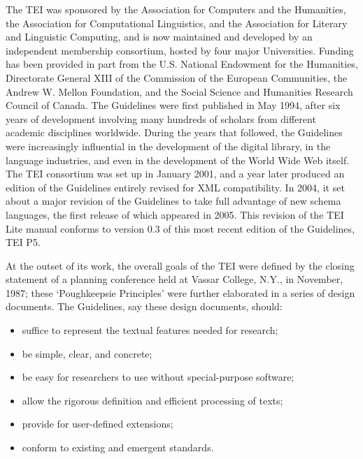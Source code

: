 \documentclass[11pt,twoside]{article}\makeatletter
\begin{document}
The TEI was sponsored by the Association for Computers and         the Humanities, the Association for Computational Linguistics,         and the Association for Literary and Linguistic Computing, and         is now maintained and developed by an independent membership         consortium, hosted by four major Universities. Funding has         been provided in part from the U.S. National Endowment for the         Humanities, Directorate General XIII of the Commission of the         European Communities, the Andrew W. Mellon Foundation, and the         Social Science and Humanities Research Council of Canada. The         Guidelines were first published in May 1994, after six years         of development involving many hundreds of scholars from         different academic disciplines worldwide. During the years         that followed, the Guidelines were increasingly influential in         the development of the digital library, in the language         industries, and even in the development of the World Wide Web         itself. The TEI consortium was set up in January 2001, and a         year later produced an  edition of the         Guidelines entirely revised for XML         compatibility. In 2004, it set about a major revision of the 	Guidelines to take full advantage of new schema 	languages, the first release of which appeared in 2005. This 	revision of the TEI Lite manual conforms to version 0.3 of 	this most recent edition of the Guidelines, TEI P5.\par
At the outset of its work, the overall goals of the TEI         were defined by the closing statement of a planning conference         held at Vassar College, N.Y., in November, 1987; these         ‘Poughkeepsie Principles’ were further         elaborated in a series of design documents.  The Guidelines,         say these design documents, should:  \begin{itemize}

\item suffice to represent the textual features needed for        research;
\item be simple, clear, and concrete;
\item be easy for researchers to use without special-purpose software;
\item allow the rigorous definition and efficient processing of texts;
\item provide for user-defined extensions;
\item conform to existing and emergent standards.
\end{itemize} \par
\end{document}
